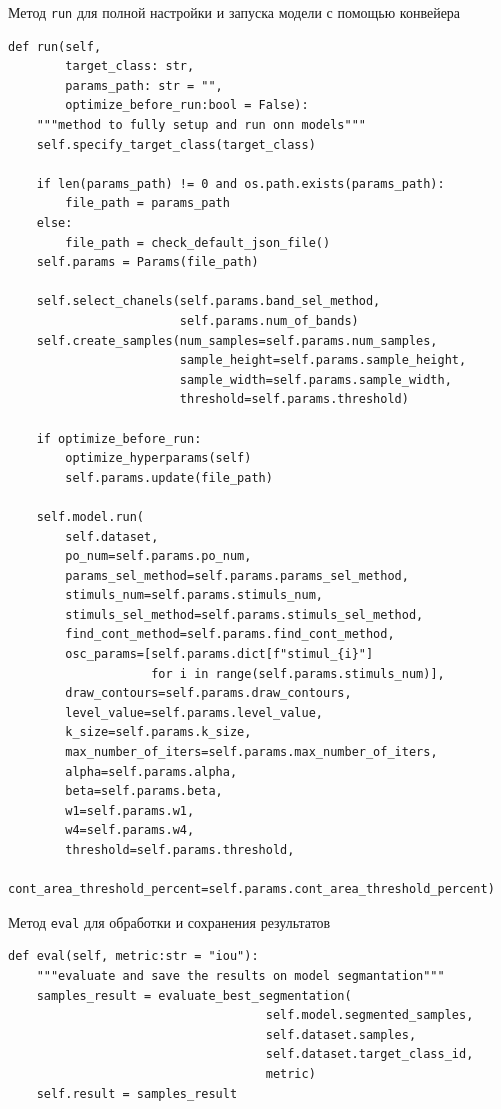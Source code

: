 \documentclass[14pt, russian]{scrartcl}
\begin{document}
\begin{listing}[H]
    \caption{Метод \texttt{run} для полной настройки и запуска модели с помощью конвейера}
    \label{lst:pipeline_run}
    \begin{verbatim}
def run(self, 
        target_class: str,
        params_path: str = "",
        optimize_before_run:bool = False):
    """method to fully setup and run onn models"""
    self.specify_target_class(target_class)

    if len(params_path) != 0 and os.path.exists(params_path):
        file_path = params_path
    else:
        file_path = check_default_json_file()
    self.params = Params(file_path)

    self.select_chanels(self.params.band_sel_method, 
                        self.params.num_of_bands)
    self.create_samples(num_samples=self.params.num_samples,
                        sample_height=self.params.sample_height,
                        sample_width=self.params.sample_width,
                        threshold=self.params.threshold)
    
    if optimize_before_run:     
        optimize_hyperparams(self)
        self.params.update(file_path)

    self.model.run(
        self.dataset, 
        po_num=self.params.po_num, 
        params_sel_method=self.params.params_sel_method,
        stimuls_num=self.params.stimuls_num,
        stimuls_sel_method=self.params.stimuls_sel_method,
        find_cont_method=self.params.find_cont_method, 
        osc_params=[self.params.dict[f"stimul_{i}"] 
                    for i in range(self.params.stimuls_num)],
        draw_contours=self.params.draw_contours,
        level_value=self.params.level_value,
        k_size=self.params.k_size,
        max_number_of_iters=self.params.max_number_of_iters,
        alpha=self.params.alpha,
        beta=self.params.beta,
        w1=self.params.w1,
        w4=self.params.w4,
        threshold=self.params.threshold,
        cont_area_threshold_percent=self.params.cont_area_threshold_percent)
    \end{verbatim}
\end{listing}

\begin{listing}[H]
    \caption{Метод \texttt{eval} для обработки и сохранения результатов}
    \label{lst:pipeline_eval}
    \begin{verbatim}
def eval(self, metric:str = "iou"):
    """evaluate and save the results on model segmantation"""
    samples_result = evaluate_best_segmentation(
                                    self.model.segmented_samples,
                                    self.dataset.samples,
                                    self.dataset.target_class_id,
                                    metric)
    self.result = samples_result
    \end{verbatim}
\end{listing}
\end{document}
